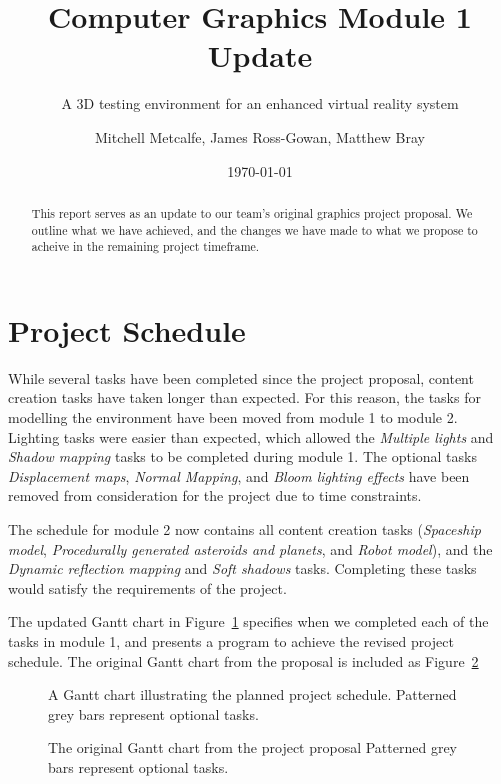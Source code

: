 \documentclass[11pt]{scrartcl} %
\title{Computer Graphics Module 1 Update}
\subtitle{A 3D testing environment for an enhanced virtual reality system}
\author{Mitchell Metcalfe, James Ross-Gowan, Matthew Bray }
\date{\today} %
\newcommand{\taskname}[1]{{\textit{#1}}}
\begin{document}
\maketitle

\begin{abstract}

    This report serves as an update to our team's original graphics
    project proposal.  We outline what we have achieved, and the
    changes we have made to what we propose to acheive in the remaining
    project timeframe.

\end{abstract}

\section*{Project Schedule}
    
    While several tasks have been completed since the project proposal, content
    creation tasks have taken longer than expected. For this reason, the tasks
    for modelling the environment have been moved from module 1 to module 2.
    Lighting tasks were easier than expected, which allowed the \taskname{Multiple lights} and \taskname{Shadow mapping} tasks to be completed during module 1.
    The optional tasks \taskname{Displacement maps}, \taskname{Normal Mapping}, and \taskname{Bloom lighting effects} have been removed from consideration for the project due to time constraints.

    The schedule for module 2 now contains all content creation tasks (\taskname{Spaceship model}, \taskname{Procedurally generated asteroids and
    planets}, and \taskname{Robot model}), and the \taskname{Dynamic
    reflection mapping} and \taskname{Soft shadows} tasks. Completing these
    tasks would satisfy the requirements of the project.

    The updated Gantt chart in Figure~\ref{gantt:module1} specifies when
    we completed each of the tasks in module 1, and
    presents a program to achieve the revised project schedule.
    The original Gantt chart from the proposal is included as Figure~\ref{gantt:proposal}

    \begin{figure}[H]
        \makebox[\textwidth][c]{\resizebox{0.95\paperwidth}{!}{}}
        \caption[Project Schedule]{
            A Gantt chart illustrating the planned project schedule.
            Patterned grey bars represent optional tasks.
        }
        \label{gantt:module1}
    \end{figure}

    \begin{figure}[H]
        \makebox[\textwidth][c]{\resizebox{0.95\paperwidth}{!}{}}
        \caption[Project Schedule]{
            The original Gantt chart from the project proposal
            Patterned grey bars represent optional tasks.
        }
        \label{gantt:proposal}
    \end{figure}
\end{document}

